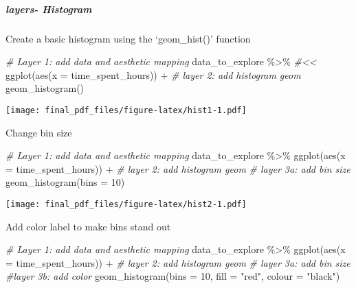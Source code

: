 \documentclass[
]{article}
\newenvironment{Shaded}{\begin{snugshade}}{\end{snugshade}}
\newcommand{\AttributeTok}[1]{\textcolor[rgb]{0.77,0.63,0.00}{#1}}
\newcommand{\CommentTok}[1]{\textcolor[rgb]{0.56,0.35,0.01}{\textit{#1}}}
\newcommand{\DecValTok}[1]{\textcolor[rgb]{0.00,0.00,0.81}{#1}}
\newcommand{\FunctionTok}[1]{\textcolor[rgb]{0.00,0.00,0.00}{#1}}
\newcommand{\NormalTok}[1]{#1}
\newcommand{\SpecialCharTok}[1]{\textcolor[rgb]{0.00,0.00,0.00}{#1}}
\newcommand{\StringTok}[1]{\textcolor[rgb]{0.31,0.60,0.02}{#1}}
\begin{document}
\hypertarget{layers--histogram}{%
\subparagraph{layers- Histogram}\label{layers--histogram}}

Create a basic histogram using the `geom\_hist()' function

\begin{Shaded}
\begin{Highlighting}[]
\CommentTok{\# Layer 1: add data and aesthetic mapping}
\NormalTok{data\_to\_explore }\SpecialCharTok{\%\textgreater{}\%} \CommentTok{\#\textless{}\textless{}}
  \FunctionTok{ggplot}\NormalTok{(}\FunctionTok{aes}\NormalTok{(}\AttributeTok{x =}\NormalTok{ time\_spent\_hours)) }\SpecialCharTok{+}
\CommentTok{\# layer 2: add histogram geom}
  \FunctionTok{geom\_histogram}\NormalTok{()}
\end{Highlighting}
\end{Shaded}

\texttt{[image: final\_pdf\_files/figure-latex/hist1-1.pdf]}

Change bin size

\begin{Shaded}
\begin{Highlighting}[]
\CommentTok{\# Layer 1: add data and aesthetic mapping}
\NormalTok{data\_to\_explore }\SpecialCharTok{\%\textgreater{}\%} 
  \FunctionTok{ggplot}\NormalTok{(}\FunctionTok{aes}\NormalTok{(}\AttributeTok{x =}\NormalTok{ time\_spent\_hours)) }\SpecialCharTok{+}
\CommentTok{\# layer 2: add histogram geom }
\CommentTok{\# layer 3a: add bin size}
  \FunctionTok{geom\_histogram}\NormalTok{(}\AttributeTok{bins =} \DecValTok{10}\NormalTok{)}
\end{Highlighting}
\end{Shaded}

\texttt{[image: final\_pdf\_files/figure-latex/hist2-1.pdf]}

Add color label to make bins stand out

\begin{Shaded}
\begin{Highlighting}[]
\CommentTok{\# Layer 1: add data and aesthetic mapping}
\NormalTok{data\_to\_explore }\SpecialCharTok{\%\textgreater{}\%} 
  \FunctionTok{ggplot}\NormalTok{(}\FunctionTok{aes}\NormalTok{(}\AttributeTok{x =}\NormalTok{ time\_spent\_hours)) }\SpecialCharTok{+}
\CommentTok{\# layer 2: add histogram geom }
\CommentTok{\# layer 3a: add bin size}
\CommentTok{\#layer 3b: add color}
  \FunctionTok{geom\_histogram}\NormalTok{(}\AttributeTok{bins =} \DecValTok{10}\NormalTok{,}
                 \AttributeTok{fill =} \StringTok{"red"}\NormalTok{, }
                 \AttributeTok{colour =} \StringTok{"black"}\NormalTok{) }
\end{Highlighting}
\end{Shaded}
\end{document}
